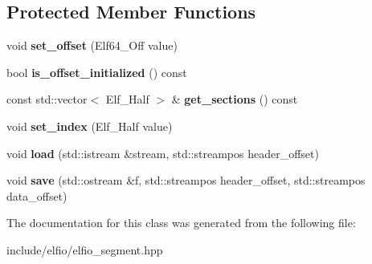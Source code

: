 \subsection*{Protected Member Functions}
\begin{DoxyCompactItemize}
\item 
void {\bfseries set\+\_\+offset} (Elf64\+\_\+\+Off value)\hypertarget{class_e_l_f_i_o_1_1segment__impl_a7e314d5189aa3fa7541bb1be6df37b1f}{}\label{class_e_l_f_i_o_1_1segment__impl_a7e314d5189aa3fa7541bb1be6df37b1f}

\item 
bool {\bfseries is\+\_\+offset\+\_\+initialized} () const \hypertarget{class_e_l_f_i_o_1_1segment__impl_a912741d7fc8e49cc510d4932efe947ad}{}\label{class_e_l_f_i_o_1_1segment__impl_a912741d7fc8e49cc510d4932efe947ad}

\item 
const std\+::vector$<$ Elf\+\_\+\+Half $>$ \& {\bfseries get\+\_\+sections} () const \hypertarget{class_e_l_f_i_o_1_1segment__impl_a8d3c037e0592103aef38191dcf8acc75}{}\label{class_e_l_f_i_o_1_1segment__impl_a8d3c037e0592103aef38191dcf8acc75}

\item 
void {\bfseries set\+\_\+index} (Elf\+\_\+\+Half value)\hypertarget{class_e_l_f_i_o_1_1segment__impl_a69b90b35533190bdc3f082226252b9f5}{}\label{class_e_l_f_i_o_1_1segment__impl_a69b90b35533190bdc3f082226252b9f5}

\item 
void {\bfseries load} (std\+::istream \&stream, std\+::streampos header\+\_\+offset)\hypertarget{class_e_l_f_i_o_1_1segment__impl_a7786ca717e6f84ea5bd41a8ede7498cc}{}\label{class_e_l_f_i_o_1_1segment__impl_a7786ca717e6f84ea5bd41a8ede7498cc}

\item 
void {\bfseries save} (std\+::ostream \&f, std\+::streampos header\+\_\+offset, std\+::streampos data\+\_\+offset)\hypertarget{class_e_l_f_i_o_1_1segment__impl_abca72b0562242f33bd92557628e288ae}{}\label{class_e_l_f_i_o_1_1segment__impl_abca72b0562242f33bd92557628e288ae}

\end{DoxyCompactItemize}


The documentation for this class was generated from the following file\+:\begin{DoxyCompactItemize}
\item 
include/elfio/elfio\+\_\+segment.\+hpp\end{DoxyCompactItemize}
